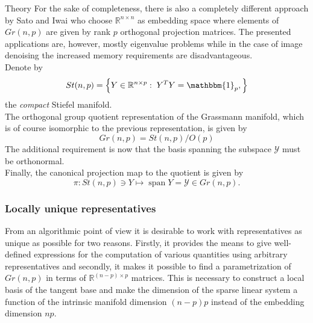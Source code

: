 \begin{chapter}{Theory}
For the sake of completeness, there is also a completely different approach by Sato and Iwai \cite{Sato2014} who choose $\mathbb{R}^{n\times n}$ as embedding space
where elements of $Gr(n,p)$ are given by rank $p$ orthogonal projection matrices. The presented applications are, however, mostly eigenvalue problems while in the case
of image denoising the increased memory requirements are disadvantageous.\\

Denote by 
\begin{equation}
St(n,p)=\left\lbrace Y\in\mathbb{R}^{n\times p}:\; Y^TY=\mathbbm{1}_p,\right\rbrace
\end{equation}
the \emph{compact} Stiefel manifold.\\

The orthogonal group quotient representation of the Grassmann manifold, which is of course isomorphic to the previous representation, is given by
\begin{equation}
    Gr(n,p) = St(n,p) / O(p) %
\end{equation}
The additional requirement is now that the basis spanning the subspace $\mathcal{Y}$ must be orthonormal. \\

Finally, the canonical projection map to the quotient is given by
\begin{equation}
    \pi : St(n,p)\ni Y \mapsto \operatorname{span} Y=\mathcal{Y} \in Gr(n, p).
\end{equation}

\subsubsection{Locally unique representatives} %
\label{ssub:Locally unique Representative}
From an algorithmic point of view it is desirable to work with representatives as unique as possible for two reasons.
Firstly, it provides the means to give well-defined expressions for the computation of various quantities using arbitrary representatives and secondly, it makes it possible to find a parametrization of $Gr(n,p)$ in terms of $\mathbb{R}^{(n-p)\times p}$ matrices.
This is necessary to construct a local basis of the tangent base and make the dimension of the sparse linear system a function of the intrinsic manifold dimension $(n-p)p$ instead of the embedding dimension $np$.\\


\end{chapter}
